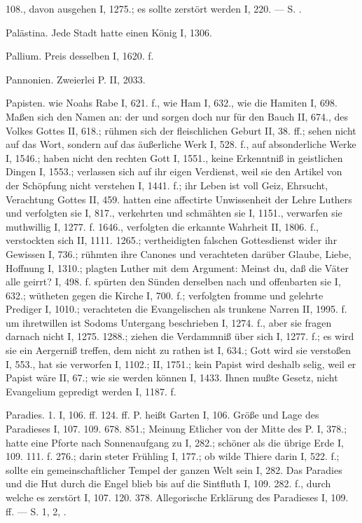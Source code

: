 108., davon ausgehen I, 1275.; es sollte zerstört werden I, 220. — S. .

Palästina. Jede Stadt hatte einen König I, 1306.

Pallium. Preis desselben I, 1620. f.

Pannonien. Zweierlei P. II, 2033.

Papisten.  wie Noahs Rabe I, 621. f., wie Ham I, 632., wie die Hamiten I, 698. Maßen sich den Namen an: der  und sorgen doch nur für den Bauch II, 674., des Volkes Gottes II, 618.; rühmen sich der fleischlichen Geburt II, 38. ff.; sehen nicht auf das Wort, sondern auf das äußerliche Werk I, 528. f., auf absonderliche Werke I, 1546.; haben nicht den rechten Gott I, 1551., keine Erkenntniß in geistlichen Dingen I, 1553.; verlassen sich auf ihr eigen Verdienst, weil sie den Artikel von der Schöpfung nicht verstehen I, 1441. f.; ihr Leben ist voll Geiz, Ehrsucht, Verachtung Gottes II, 459.  hatten eine affectirte Unwissenheit der Lehre Luthers und verfolgten sie I, 817., verkehrten und schmähten sie I, 1151., verwarfen sie muthwillig I, 1277. f. 1646., verfolgten die erkannte
Wahrheit II, 1806. f., verstockten sich II, 1111. 1265.; vertheidigten falschen Gottesdienst wider ihr Gewissen I, 736.; rühmten ihre Canones und verachteten darüber Glaube, Liebe, Hoffnung I, 1310.; plagten Luther mit dem Argument: Meinst du, daß die Väter alle geirrt? I, 498. f.  spürten den Sünden derselben nach und offenbarten sie I, 632.; wütheten gegen die Kirche I, 700. f.; verfolgten fromme und gelehrte Prediger I, 1010.; verachteten die Evangelischen als trunkene Narren II, 1995. f.  um ihretwillen ist Sodoms Untergang beschrieben I, 1274. f., aber sie fragen darnach nicht I, 1275. 1288.; ziehen die Verdammniß über sich I, 1277. f.; es wird sie ein Aergerniß treffen, dem nicht zu rathen ist I, 634.; Gott wird sie verstoßen I, 553., hat sie verworfen I, 1102.; II, 1751.; kein Papist wird deshalb selig, weil er Papist wäre II, 67.; wie sie  werden können I, 1433. Ihnen mußte Gesetz, nicht Evangelium gepredigt werden I, 1187. f.

Paradies. 1.  I, 106. ff. 124. ff. P. heißt Garten I, 106. Größe und Lage des Paradieses I, 107. 109. 678. 851.; Meinung Etlicher von der Mitte des P. I, 378.; hatte eine Pforte nach Sonnenaufgang zu I, 282.; schöner als die übrige Erde I, 109. 111. f. 276.; darin steter Frühling I, 177.; ob wilde Thiere darin I, 522. f.; sollte ein gemeinschaftlicher Tempel der ganzen Welt sein I, 282. Das Paradies und die Hut durch die Engel blieb bis auf die Sintfluth I, 109. 282. f., durch welche es zerstört I, 107. 120. 378. Allegorische Erklärung des Paradieses I, 109. ff. — S.  1, 2, .

